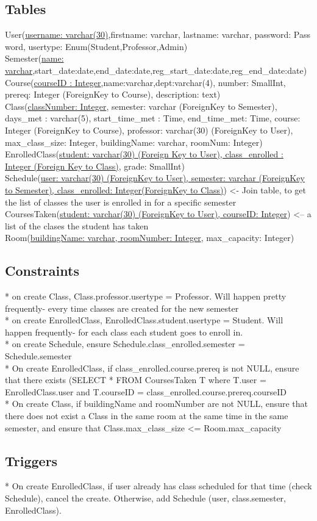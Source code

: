 \documentclass[11pt,oneside,a4paper]{article}
\begin{document}
\subsection{Tables}
User(\underline{username: varchar(30)},firstname: varchar, lastname: varchar,
password: Pass	word, usertype: Enum(Student,Professor,Admin)
\\
Semester(\underline{name:
varchar},start\_date:date,end\_date:date,reg\_start\_date:date,reg\_end\_date:date)
\\
Course(\underline{courseID	: Integer},name:varchar,dept:varchar(4), number:
SmallInt, prereq: Integer (ForeignKey to Course), description: text)
\\
Class(\underline{classNumber: Integer}, semester: varchar (ForeignKey to
Semester), days\_met : varchar(5), start\_time\_met : Time, end\_time\_met:
Time, course: Integer (ForeignKey to Course), professor: varchar(30)
(ForeignKey to User), max\_class\_size: Integer, buildingName: varchar,
roomNum: Integer)
\\
EnrolledClass(\underline{student: varchar(30) (Foreign Key to User),
class\_enrolled : Integer (Foreign Key to Class)}, grade: SmallInt)
\\
Schedule(\underline{user: varchar(30) (ForeignKey to User), semester: varchar
(ForeignKey to Semester), class\_enrolled: Integer(ForeignKey to Class)}) <-
Join table, to get the list of classes the user is enrolled in for a specific
semester
\\
CoursesTaken(\underline{student: varchar(30) (ForeignKey to User), courseID:
Integer}) <-- a list of the clases the student has taken\\
Room(\underline{buildingName: varchar, roomNumber: Integer}, max\_capacity:
Integer)
\subsection{Constraints}
	* on create Class, Class.professor.usertype = Professor. Will happen pretty
	frequently- every time classes are created for the new semester\\
	* on create EnrolledClass, EnrolledClass.student.usertype = Student. Will
	happen frequently- for each class each student goes to enroll in.\\
	* on create Schedule, ensure Schedule.class\_enrolled.semester =
	Schedule.semester\\
	* On create EnrolledClass, if class\_enrolled.course.prereq is not NULL, ensure
	that there exists (SELECT * FROM CoursesTaken T where T.user =
	EnrolledClass.user and T.courseID =
	class\_enrolled.course.prereq.courseID\\
	* On create Class, if buildingName and roomNumber are not NULL, ensure that
	there does not exist a Class in the same room at the same time in the same
	semester, and ensure that Class.max\_class\_size <= Room.max\_capacity
\subsection{Triggers}
	* On create EnrolledClass, if user already has class scheduled for that
	time (check Schedule), cancel the create. Otherwise, add Schedule (user, class.semester,
	EnrolledClass). 
\end{document}
